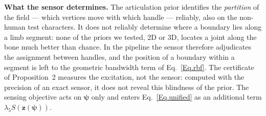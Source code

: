 \documentclass[lettersize,journal]{IEEEtran}
\newenvironment{revblock}{\par\color{red}}{\par}
\begin{document}
\begin{revblock}
\textbf{What the sensor determines.} The articulation prior identifies the \textit{partition} of
the field --- which vertices move with which handle --- reliably, also on the non-human test
characters. It does not reliably determine where a boundary lies along a limb segment:
none of the priors we tested, 2D or 3D, locates a joint along the bone much better than chance.
In the pipeline the
sensor therefore adjudicates the assignment between handles, and the position of a boundary
within a segment is left to the geometric bandwidth term of Eq.~\ref{Eq.rbf}. The certificate of
Proposition~2 measures the excitation, not the sensor: computed with the precision of an exact
sensor, it does not reveal this blindness of the prior. The sensing
objective acts on $\bm{\psi}$ only and enters Eq.~\ref{Eq.unified} as an additional term
$\lambda_{5}S(\bm{z}(\bm{\psi}))$.
\end{revblock}
\end{document}
